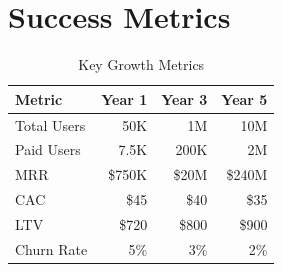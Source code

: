 \section{Success Metrics}

\begin{table}[H]
\centering
\caption{Key Growth Metrics}
\begin{tabular}{|l|r|r|r|}
\hline
\rowcolor{lightgray}
\textbf{Metric} & \textbf{Year 1} & \textbf{Year 3} & \textbf{Year 5} \\
\hline
Total Users & 50K & 1M & 10M \\
\hline
Paid Users & 7.5K & 200K & 2M \\
\hline
MRR & \$750K & \$20M & \$240M \\
\hline
CAC & \$45 & \$40 & \$35 \\
\hline
LTV & \$720 & \$800 & \$900 \\
\hline
Churn Rate & 5\% & 3\% & 2\% \\
\hline
\end{tabular}
\end{table}

